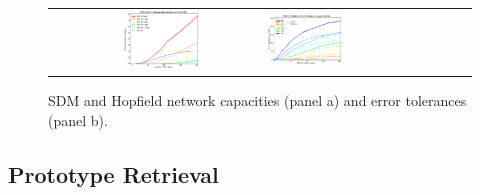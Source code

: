 \documentclass[10pt,letterpaper]{article}
\begin{document}
\begin{center}
\begin{figure}[t!]
{
	\hfill{}
	\begin{tabular}{lclc}
	\raisebox{1.75in}{(a)} &
		\includegraphics[width=0.4\textwidth]{./figures/capacity-edit.png}
	\raisebox{1.75in}{(b)} &
		\includegraphics[width=0.4\textwidth]{./figures/tolerance-edit.png} 
	\end{tabular}
}
\hfill{}
\caption{SDM and Hopfield network capacities (panel a) and error tolerances (panel b).}
\label{fig:capacity}
\end{figure}
\end{center}


\subsection{Prototype Retrieval}

\end{document}
